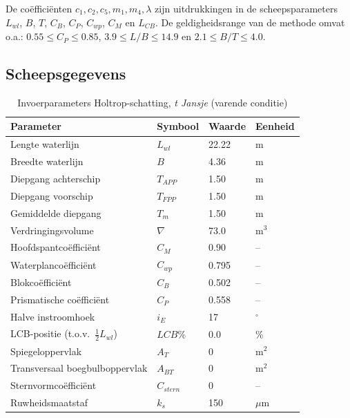\noindent De coëfficiënten $c_1, c_2, c_5, m_1, m_4, \lambda$ zijn uitdrukkingen in de scheepsparameters $L_{wl}$, $B$, $T$, $C_B$, $C_P$, $C_{wp}$, $C_M$ en $L_{CB}$. De geldigheidsrange van de methode omvat o.a.:
$0.55 \leq C_P \leq 0.85$, $3.9 \leq L/B \leq 14.9$ en $2.1 \leq B/T \leq 4.0$.

\newpage
\subsection{Scheepsgegevens}

\begin{table}[h!]
\centering
\caption{Invoerparameters Holtrop-schatting, \emph{t Jansje} (varende conditie)}
\label{tab:holtrop_input}
\begin{tabular}{llll}
\toprule
Parameter & Symbool & Waarde & Eenheid \\
\midrule
Lengte waterlijn           & $L_{wl}$  & 22.22    & m       \\
Breedte waterlijn          & $B$       & 4.36     & m       \\
Diepgang achterschip       & $T_{APP}$ & 1.50     & m       \\
Diepgang voorschip         & $T_{FPP}$ & 1.50     & m       \\
Gemiddelde diepgang        & $T_m$     & 1.50     & m       \\
Verdringingsvolume         & $\nabla$  & 73.0     & m$^3$   \\
Hoofdspantcoëfficiënt      & $C_M$     & 0.90     & --      \\
Waterplancoëfficiënt       & $C_{wp}$  & 0.795    & --      \\
Blokcoëfficiënt            & $C_B$     & 0.502    & --      \\
Prismatische coëfficiënt   & $C_P$     & 0.558    & --      \\
Halve instroomhoek         & $i_E$     & 17       & $^\circ$\\
LCB-positie (t.o.v.\ $\tfrac{1}{2}L_{wl}$) & $LCB$\% & 0.0 & \%  \\
Spiegeloppervlak           & $A_T$     & 0        & m$^2$   \\
Transversaal boegbulboppervlak & $A_{BT}$ & 0     & m$^2$   \\
Sternvormcoëfficiënt       & $C_{stern}$& 0       & --      \\
Ruwheidsmaatstaf           & $k_s$     & 150      & $\mu$m  \\
\bottomrule
\end{tabular}
\end{table}

